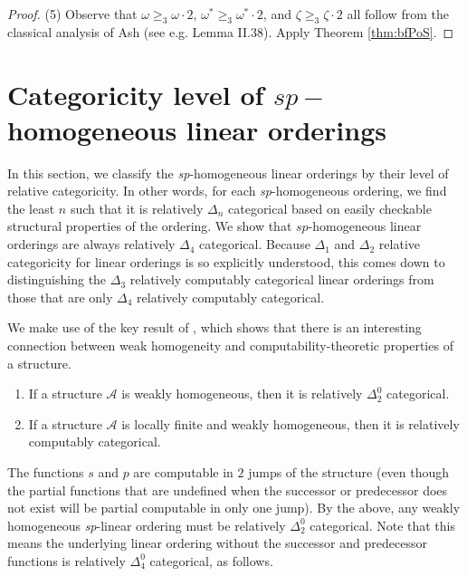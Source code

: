 \documentclass[11pt]{amsart}
\theoremstyle{definition}
\def\A{\mathcal A}
\begin{document}
\begin{proof}
\medskip

(5) Observe that $\omega\geq_3\omega\cdot2$, $\omega^*\geq_3\omega^*\cdot2$, and $\zeta\geq_3\zeta\cdot2$ all follow from the classical analysis of Ash (see e.g. \cite{cst1} Lemma II.38). Apply Theorem \ref{thm:bfPoS}.

\end{proof}



\section{Categoricity level of $sp-$homogeneous linear orderings}

In this section, we classify the \textit{sp}-homogeneous linear orderings by their level of relative categoricity.
In other words, for each \textit{sp}-homogeneous ordering, we find the least $n$ such that it is relatively $\Delta_n$ categorical based on easily checkable structural properties of the ordering.
We show that $sp$-homogeneous linear orderings are always relatively $\Delta_4$ categorical.
Because $\Delta_1$ and $\Delta_2$ relative categoricity for linear orderings is so explicitly understood, this comes down to distinguishing the $\Delta_3$ relatively computably categorical linear orderings from those that are only $\Delta_4$ relatively computably categorical.


We make use of the key result of \cite{AC17}, which shows that there is an interesting connection between weak homogeneity and computability-theoretic properties of a structure.

\begin{theorem}\label{thmAC}
\begin{enumerate}
\item If a structure $\A$ is weakly homogeneous, then it is relatively $\Delta^0_2$ categorical.
\item If a structure $\A$ is locally finite and weakly homogeneous, then it is relatively computably categorical.
\end{enumerate}
\end{theorem}

The functions $s$ and $p$ are computable in $2$ jumps of the structure (even though the partial functions that are undefined when the successor or predecessor does not exist will be partial computable in only one jump). By the above, any weakly homogeneous 
\textit{sp}-linear ordering must be relatively $\Delta^0_2$ categorical.
Note that this means the underlying linear ordering without the successor and predecessor functions is relatively $\Delta^0_4$ categorical, as follows. 
\end{document}
